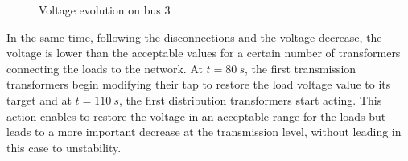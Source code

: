 \documentclass[a4paper, 12pt]{report}
\begin{document}
\begin{figure}[H]
{
}
\caption{Voltage evolution on bus 3}
\end{figure}

In the same time, following the disconnections and the voltage decrease, the voltage is lower than the acceptable values for a certain number of transformers connecting the loads to the network. At $t = 80 \ s$, the first transmission transformers begin modifying their tap to restore the load voltage value to its target and at $t = 110 \ s$, the first distribution transformers start acting. This action enables to restore the voltage in an acceptable range for the loads but leads to a more important decrease at the transmission level, without leading in this case to unstability.
\end{document}

